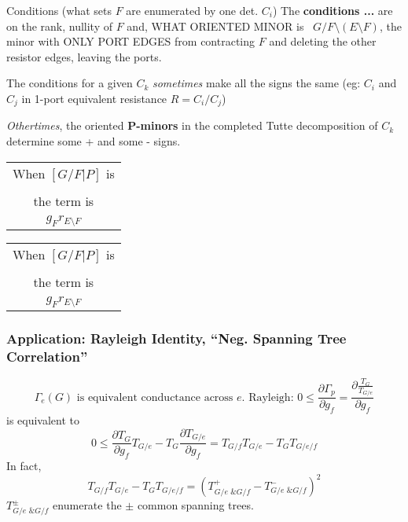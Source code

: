 \documentclass{article}
\newcommand{\Remph}[1]{{\color{red}#1}}
\begin{document}
\begin{frame}{Conditions (what sets $F$ are enumerated by one det. $C_i$)
}
The \textbf{conditions ...}
are on the rank, nullity of $F$ and, WHAT ORIENTED MINOR is \
$G/F\setminus (E\setminus F)$, the minor
with ONLY PORT EDGES from contracting $F$
and deleting the other resistor edges, leaving the
ports.

The conditions for a given $C_k$ \textit{sometimes}
make all the signs the same (eg: $C_i$ and 
$C_j$ in 1-port equivalent resistance $R=C_i/C_j$)

\textit{Othertimes}, the oriented \textbf{P-minors}
in the completed Tutte decomposition of $C_k$ determine
some + and some - signs.

\begin{center}
\begin{minipage}{0.3\textwidth}
\begin{tabular}{c}
When $[G/F|P]$ is \\
 \\
the term is \\
\Remph{{\LARGE\bf +}}$g_Fr_{E\setminus F}$ \\
\end{tabular}
\end{minipage}
\begin{minipage}{0.3\textwidth}
\begin{tabular}{c}
When $[G/F|P]$ is\\
\\
the term is\\
\Remph{{\LARGE\bf -}}$g_Fr_{E\setminus F}$\\
\end{tabular}
\end{minipage}
\end{center}

\end{frame}

\begin{frame}
\frametitle{Application: Rayleigh Identity, ``Neg. Spanning Tree Correlation''}
\[
\Gamma_e(G)\text{ is equivalent conductance across }e.
\text{ Rayleigh: }0 \le \frac{\partial \Gamma_{p}}{\partial g_f} =
\frac{\partial \frac{T_G}{T_{G/e}}}{\partial g_f}
\]
is equivalent to 
\[
0 \le \frac{\partial T_G}{\partial g_f}T_{G/e} - 
       T_G\frac{\partial T_{G/e}}{\partial g_f} 
=
T_{G/f}T_{G/e} - T_GT_{G/e/f}
\]
In fact,
\[
T_{G/f}T_{G/e} - T_GT_{G/e/f} = \left( T^+_{G/e \text{ \& } G/f} - T^-_{G/e \text{ \& } G/f} \right)^2
\]
$T^{\pm}_{G/e \text{ \& } G/f}$ enumerate the $\pm$ common spanning trees.
\end{frame}
\end{document}
